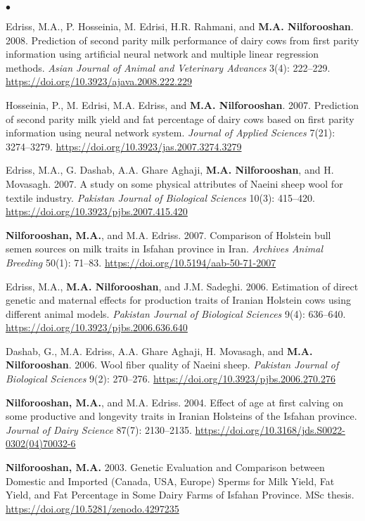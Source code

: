 \documentclass[margin,line]{res}
\newenvironment{list2}{
  \begin{list}{$\bullet$}{%
      \setlength{\itemsep}{0in}
      \setlength{\parsep}{0in} \setlength{\parskip}{0in}
      \setlength{\topsep}{0in} \setlength{\partopsep}{0in}
      \setlength{\leftmargin}{0.2in}}}{\end{list}}
\begin{document}
\begin{resume}
\begin{list2}
    \item Edriss, M.A., P. Hosseinia, M. Edrisi, H.R. Rahmani, and {\bf M.A. Nilforooshan}. 2008. Prediction of second parity milk performance of dairy cows from first parity information using artificial neural network and multiple linear regression methods. {\em Asian Journal of Animal and Veterinary Advances} 3(4): 222--229. \url{https://doi.org/10.3923/ajava.2008.222.229}
    \item Hosseinia, P., M. Edrisi, M.A. Edriss, and {\bf M.A. Nilforooshan}. 2007. Prediction of second parity milk yield and fat percentage of dairy cows based on first parity information using neural network system. {\em Journal of Applied Sciences} 7(21): 3274--3279. \url{https://doi.org/10.3923/jas.2007.3274.3279}
    \item Edriss, M.A., G. Dashab, A.A. Ghare Aghaji, {\bf M.A. Nilforooshan}, and H. Movasagh. 2007. A study on some physical attributes of Naeini sheep wool for textile industry. {\em Pakistan Journal of Biological Sciences} 10(3): 415--420. \url{https://doi.org/10.3923/pjbs.2007.415.420}
    \item {\bf Nilforooshan, M.A.}, and M.A. Edriss. 2007. Comparison of Holstein bull semen sources on milk traits in Isfahan province in Iran. {\em Archives Animal Breeding} 50(1): 71--83. \url{https://doi.org/10.5194/aab-50-71-2007}
    \item Edriss, M.A., {\bf M.A. Nilforooshan}, and J.M. Sadeghi. 2006. Estimation of direct genetic and maternal effects for production traits of Iranian Holstein cows using different animal models. {\em Pakistan Journal of Biological Sciences} 9(4): 636--640. \url{https://doi.org/10.3923/pjbs.2006.636.640}
    \item Dashab, G., M.A. Edriss, A.A. Ghare Aghaji, H. Movasagh, and {\bf M.A. Nilforooshan}. 2006. Wool fiber quality of Naeini sheep. {\em Pakistan Journal of Biological Sciences} 9(2): 270--276. \url{https://doi.org/10.3923/pjbs.2006.270.276}
    \item {\bf Nilforooshan, M.A.}, and M.A. Edriss. 2004. Effect of age at first calving on some productive and longevity traits in Iranian Holsteins of the Isfahan province. {\em Journal of Dairy Science} 87(7): 2130--2135. \url{https://doi.org/10.3168/jds.S0022-0302(04)70032-6}
    \item {\bf Nilforooshan, M.A.} 2003. Genetic Evaluation and Comparison between Domestic and Imported (Canada, USA, Europe) Sperms for Milk Yield, Fat Yield, and Fat Percentage in Some Dairy Farms of Isfahan Province. MSc thesis. \url{https://doi.org/10.5281/zenodo.4297235}
  \end{list2}

\end{resume}
\end{document}
